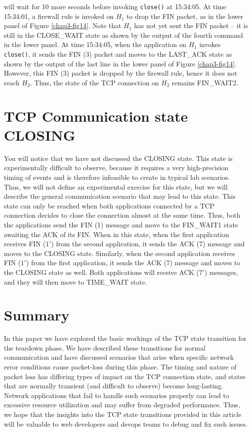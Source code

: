 \begin{multicols}{2}
\noindent
will wait for 10 more seconds before invoking \lstinline|close()| at 15:34:05. At time 15:34:01, a firewall rule is invoked on $H_{1}$ to drop the FIN packet, as in the lower panel of Figure \ref{chap3-fig14}. Note that $H_{1}$ has not yet sent the FIN packet -- it is still in the CLOSE\_WAIT state as shown by the output of the fourth command in the lower panel. At time 15:34:05, when the application on $H_{1}$ invokes \lstinline|close()|, it sends the FIN (3) packet and moves to the LAST\_ACK state as shown by the output of the last line in the lower panel of Figure \ref{chap3-fig14}. However, this FIN (3) packet is dropped by the firewall rule, hence it does not reach $H_{2}$. Thus, the state of the TCP connection on $H_{2}$ remains FIN\_WAIT2.
\vskip -1cm

\section{TCP Communication state\\ CLOSING}
\vskip -0.3cm

You will notice that we have not discussed the CLOSING state. This state is experimentally difficult to observe, because it requires a very high-precision timing of events and is therefore infeasible to create in typical lab scenarios. Thus, we will not define an experimental exercise for this state, but we will describe the general communication scenario that may lead to this state. This state can only be reached when both applications connected by a TCP connection decides to close the connection almost at the same time. Thus, both the applications send the FIN (1) message and move to the FIN\_WAIT1 state awaiting the ACK of its FIN. When in this state, when the first application receives FIN ($1'$) from the second application, it sends the ACK (7) message and moves to the CLOSING state. Similarly, when the second application receives FIN ($1'$) from the first application, it sends the ACK (7) message and moves to the CLOSING state as well. Both applications will receive ACK ($7'$) messages, and they will then move to TIME\_WAIT state.
\vskip -1cm

\section{Summary}
\vskip -0.5cm

In this paper we have explored the basic workings of the TCP state transition for the teardown phase. We have described these transitions for normal communication and have discussed scenarios that arise when specific network error conditions cause packet-loss during this phase. The timing and nature of packet loss has differing types of impact on the TCP connection state, and states that are normally transient (and difficult to observe) become long-lasting. Network applications that fail to handle such scenarios properly can lead to excessive resource utilization and may suffer from degraded performance. Thus, we hope that the insights into the TCP state transitions provided in this article will be valuable to web developers and devops teams to debug and fix such issues.


\end{multicols}
